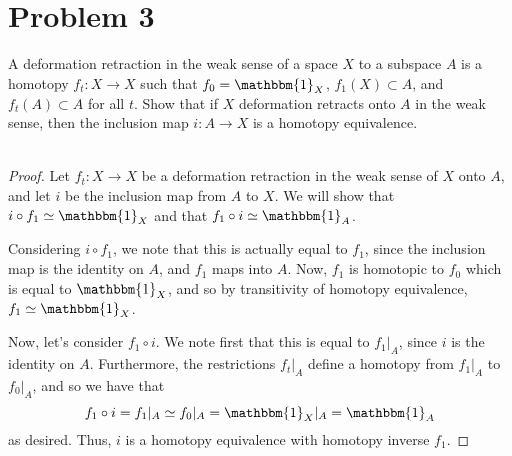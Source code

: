 \documentclass[fontsize=11pt]{scrartcl} %
\numberwithin{equation}{section} %
\numberwithin{figure}{section} %
\numberwithin{table}{section} %
\begin{document}
\newpage

\section*{Problem 3} %
A deformation retraction in the weak sense of a space $X$ to a subspace $A$ is a
homotopy $f_t:X\to X$ such that $f_0 = \mathbbm{1}_X$, $f_1(X)\subset A$, and
$f_t(A)\subset A$ for all $t$. Show that if $X$ deformation retracts onto $A$ in
the weak sense, then the inclusion map $i:A\to X$ is a homotopy equivalence.
\\
\\
\begin{proof}
Let $f_t:X\to X$ be a deformation retraction in the weak sense of $X$ onto
$A$, and let $i$ be the inclusion map from $A$ to $X$. We will show that
    $i\circ f_1 \simeq \mathbbm{1}_X$ and that $f_1\circ i \simeq
    \mathbbm{1}_A$.
    
    Considering $i\circ f_1$, we note that this is actually equal to $f_1$,
    since the inclusion map is the identity on $A$, and $f_1$ maps into $A$.
    Now, $f_1$ is homotopic to $f_0$ which is equal to $\mathbbm{1}_X$, and so
    by transitivity of homotopy equivalence, $f_1\simeq \mathbbm{1}_X$.

    Now, let's consider $f_1\circ i$. We note first that this is equal to
    $f_1|_A$, since $i$ is the identity on $A$. Furthermore, the restrictions
    $f_t|_A$ define a homotopy from $f_1|_A$ to $f_0|_A$, and so we have that
    \[
        f_1\circ i = f_1|_A\simeq f_0|_A = \mathbbm{1}_X|_A = \mathbbm{1}_A
    \]
    as desired. Thus, $i$ is a homotopy equivalence with homotopy inverse $f_1$.
\end{proof}
\end{document}
